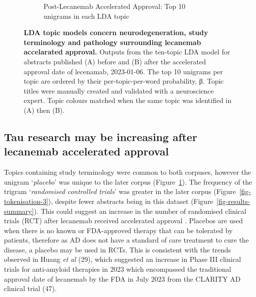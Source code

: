 \documentclass[
  a4paper,
]{article}
\begin{document}
\begin{figure}
{\begin{figure}[H]
\caption{Post-Lecanemab Accelerated Approval: Top 10 unigrams in each
LDA topic}

\end{figure}

}

\caption{\label{fig-topic-model-unigrams}\textbf{LDA topic models
concern neurodegeneration, study terminology and pathology surrounding
lecanemab accelarated approval.} Outputs from the ten-topic LDA model
for abstracts published (A) before and (B) after the accelerated
approval date of lecenamab, 2023-01-06. The top 10 unigrams per topic
are ordered by their per-topic-per-word probability, β. Topic titles
were manually created and validated with a neuroscience expert. Topic
colours matched when the same topic was identified in (A) then (B).}

\end{figure}

\hypertarget{tau-research-may-be-increasing-after-lecanemab-accelerated-approval}{%
\subsection{Tau research may be increasing after lecanemab accelerated
approval}\label{tau-research-may-be-increasing-after-lecanemab-accelerated-approval}}

Topics containing study terminology were common to both corpuses,
however the unigram `\emph{placebo}' was unique to the later corpus
(Figure~\ref{fig-topic-model-unigrams}). The frequency of the trigram
`\emph{randomised controlled trials}' was greater in the later corpus
(Figure~\ref{fig-tokenisation-3}), despite fewer abstracts being in this
dataset (Figure~\ref{fig-results-summary}). This could suggest an
increase in the number of randomised clinical trials (RCT) after
lecanemab received accelerated approval . Placebos are used when there
is no known or FDA-approved therapy that can be tolerated by patients,
therefore as AD does not have a standard of care treatment to cure the
disease, a placebo may be used in RCTs. This is consistent with the
trends observed in Huang \emph{et al} (29), which suggested an increase
in Phase III clinical trials for anti-amyloid therapies in 2023 which
encompassed the traditional approval date of lecanemab by the FDA in
July 2023 from the CLARITY AD clinical trial (47).
\end{document}
